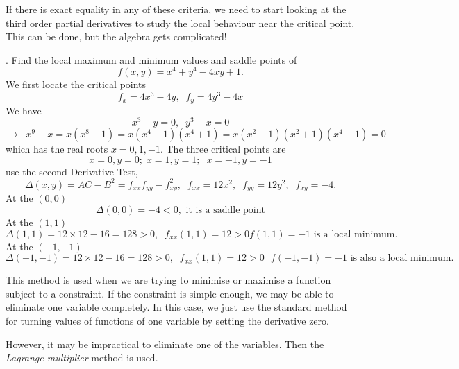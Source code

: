 \documentclass{article}
\begin{document}
If there is exact equality in any of these criteria,
we need to start looking at the third order partial derivatives to
study the local behaviour near the critical point. This can be
done, but the algebra gets complicated!

\bigskip

. Find the local maximum and minimum values
and saddle points of
$$
f(x,y)=x^4+y^4-4xy+1.
$$
We first locate the critical points
$$
f_x=4x^3-4y, \;\; f_y=4y^3-4x
$$
We have
$$
x^3-y=0, \;\;  y^3-x=0 
$$
$$
 \to \;\;
x^9-x=x(x^8-1)=x(x^4-1)(x^4+1)=x(x^2-1)(x^2+1)(x^4+1)=0
$$
which has the real roots $x=0,1,-1$. The three critical points are
$$
x=0,y=0; \; x=1, y=1; \;\; x=-1, y=-1
$$
use the second Derivative Test,
$$
\Delta(x,y) = AC-B^2=f_{xx} f_{yy}- f_{xy}^2, \;\; f_{xx}=12x^2,
\;\; f_{yy}=12y^2, \;\; f_{xy}=-4.
$$
At the $(0,0)$
$$
\Delta(0,0) =- 4<0, \mbox{ it is a saddle point}
$$
At the $(1,1)$
$$
\Delta(1,1) =12 \times 12 -16=128>0,\;\; f_{xx}(1,1)=12 >0 \mbox{
$f(1,1)=-1$  is a local minimum.}
$$
At the $(-1,-1)$
$$
\Delta(-1,-1) =12 \times 12 -16=128>0,\;\; f_{xx}(1,1)=12 >0
\mbox{ $f(-1,-1)=-1$  is also a local minimum.}
$$

\bigskip


This method is used when we are trying to minimise or maximise a
function subject to a constraint. If the constraint is simple
enough, we may be able to eliminate one variable completely. In
this case, we just use the standard method for turning values of
functions of one variable by setting the derivative zero.

However, it may be impractical to eliminate one of the variables.
Then the {\it Lagrange multiplier} method is used.
\end{document}
